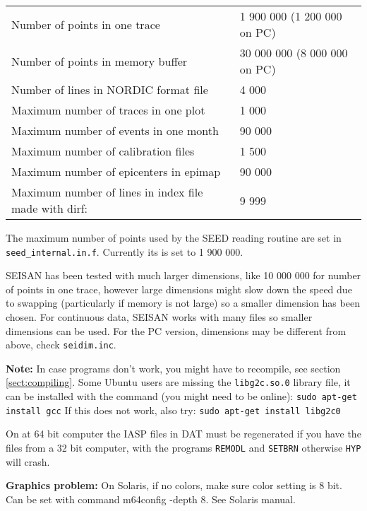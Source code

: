 \begin{tabular}{|ll|}
\hline
Number of points in one trace & 1 900 000 (1 200 000 on PC) \\
Number of points in memory buffer & 30 000 000 (8 000 000 on PC) \\
Number of lines in NORDIC format file & 4 000 \\
Maximum number of traces in one plot & 1 000 \\
Maximum number of events in one month & 90 000 \\
Maximum number of calibration files & 1 500 \\
Maximum number of epicenters in epimap & 90 000 \\
Maximum number of lines in index file made with dirf: & 9 999 \\
\hline
\end{tabular}
\newline

The maximum number of points used by the SEED reading routine 
are set in \texttt{seed\_internal.in.f}. Currently its is set to 1 900 000. 

SEISAN has been tested with much larger dimensions, like 10 000 000 
for number of points in one trace, however large dimensions might 
slow down the speed due to swapping (particularly if memory is not 
large) so a smaller dimension has been chosen. For continuous data, 
SEISAN works with many files so smaller dimensions can be used. For 
the PC version, dimensions may be different from above, check 
\texttt{seidim.inc}. 

\textbf{Note:} In case programs don't work, you might have to recompile, 
see section \ref{sect:compiling}. \newline
Some Ubuntu users are missing the 
\texttt{libg2c.so.0} library file, it can be installed with the 
command (you might need to be online):\newline
\texttt{sudo apt-get install gcc} \newline
If this does not work, also try: \newline
\texttt{sudo apt-get install libg2c0}

On at  64 bit computer the IASP files in DAT 
must be regenerated
if you have the files from a 32 bit computer, with the programs \texttt{REMODL} and 
\texttt{SETBRN}
otherwise \texttt{HYP} will crash.

\textbf{Graphics problem:} 
On Solaris, if no colors, make sure color setting is 8 bit. Can be set with 
command m64config -depth 8. See Solaris manual. 

